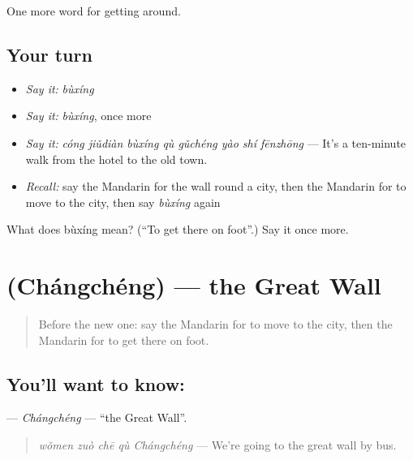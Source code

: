 \begin{grammarlens}[title={What you've built}]
One more word for getting around.
\end{grammarlens}

\subsection*{Your turn}
\begin{itemize}
\raggedright
  \item \emph{Say it:} \emph{bùxíng}
  \item \emph{Say it:} \emph{bùxíng}, once more
  \item \emph{Say it:} \emph{cóng jiǔdiàn bùxíng qù gǔchéng yào shí fēnzhōng} — It's a ten-minute walk from the hotel to the old town.
  \item \emph{Recall:} say the Mandarin for the wall round a city, then the Mandarin for to move to the city, then say \emph{bùxíng} again
\end{itemize}

\begin{tcolorbox}[breakable,colback=teal!4,colframe=teal!35!black,title={Before you move on}]
What does bùxíng mean? (\textquotedblleft{}To get there on foot\textquotedblright{}.) Say it once more.
\end{tcolorbox}
\section[\texorpdfstring{\zh{长城} (Chángchéng)}{长城 (Chángchéng)}]{ (Chángchéng) — the Great Wall}

\label{lesson:ZH-C447-changcheng}



\begin{quote}
Before the new one: say the Mandarin for to move to the city, then the Mandarin for to get there on foot.
\end{quote}

\subsection*{You'll want to know: }
\textbf{} — \emph{Chángchéng} — \textquotedblleft{}the Great Wall\textquotedblright{}.

\begin{quote}
\textbf{} \emph{wǒmen zuò chē qù Chángchéng} — We're going to the great wall by bus.
\end{quote}


